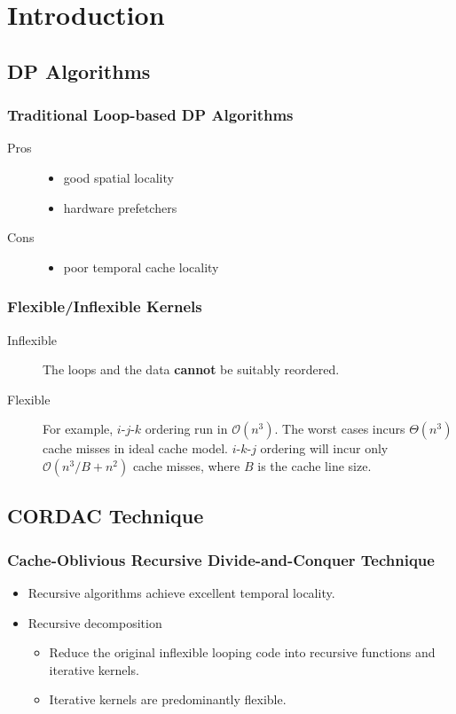 \section{Introduction}

\subsection{DP Algorithms}
\begin{frame}
    \frametitle{Traditional Loop-based DP Algorithms}
	\begin{description}
		\item[Pros]
			\begin{itemize}
				\item good spatial locality
				\item hardware prefetchers
			\end{itemize}
		\item[Cons] 
			\begin{itemize}
				\item poor temporal cache locality
			\end{itemize}
	\end{description}
\end{frame}

\begin{frame}
    \frametitle{Flexible/Inflexible Kernels}
	\begin{description}
		\item[Inflexible]
			The loops and the data \textbf{cannot} be suitably reordered.
		\item[Flexible] For example, $i$-$j$-$k$ ordering run in $\mathcal{O}(n^3)$.
			The worst cases incurs $\Theta(n^3)$ cache misses in ideal cache model.
			$i$-$k$-$j$ ordering will incur only $\mathcal{O}(n^3/B + n^2)$ cache misses,
			where $B$ is the cache line size.
	\end{description}
\end{frame}

\subsection{CORDAC Technique}
\begin{frame}
    \frametitle{Cache-Oblivious Recursive Divide-and-Conquer Technique}
	\begin{itemize}
		\item Recursive algorithms achieve excellent temporal locality.
		\item Recursive decomposition 
			\begin{itemize}
				\item Reduce the original inflexible looping code into recursive functions and iterative kernels. 
				\item Iterative kernels are predominantly flexible.
			\end{itemize}
	\end{itemize}
\end{frame}

